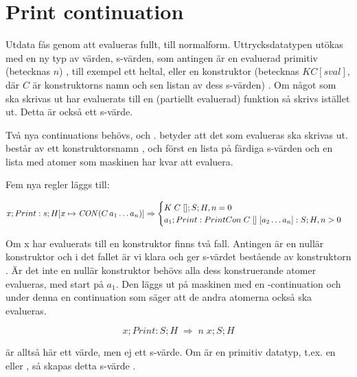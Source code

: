 \documentclass[../Appendix]{subfiles}
\begin{document}
\chapter{Print continuation}
\label{sec:printcont}
Utdata fås genom att  evalueras fullt, till normalform. 
Uttrycksdatatypen utökas med en ny typ av värden, 
s-värden, som antingen är en evaluerad primitiv (betecknas $n$)
, till exempel ett heltal, eller en konstruktor (betecknas $K C [sval]$, där
$C$ är konstruktorns namn och sen listan av dess s-värden) .
Om något som ska skrivas ut har evaluerats till en (partiellt evaluerad)
funktion så skrivs  istället ut. Detta är också ett s-värde.





Två nya continuations behövs,  och .
 betyder att det som evalueras ska skrivas ut.  består av ett
konstruktorsnamn , och först en lista på färdiga s-värden och en lista med
atomer som maskinen har kvar att evaluera.

Fem nya regler läggs till:

\[
x ; Print : s ; H[x \mapsto \text{\emph{CON}}(C\,a_1 \ldots a_n)]
\Rightarrow \begin{cases} 
K \; C \; [] ; S ; H , n = 0 \\
a_1 ; Print : PrintCon \; C \; [] \; [a_2 \ldots a_n] : S ; H , n > 0
\end{cases}
\]

Om x har evaluerats till en konstruktor  finns två fall. Antingen är 
en nullär konstruktor och i det fallet är vi klara och ger s-värdet bestående
av konstruktorn .
    Är det inte en nullär konstruktor behövs alla dess konstruerande atomer
evalueras, med start på $a_1$. Den läggs ut på maskinen med en -continuation
och under denna en continuation som säger att de andra atomerna också ska
evalueras.
 

\[
x ; Print : S ; H \; \Rightarrow \; n \; x ; S ; H
\]

 är alltså här ett värde, men ej ett s-värde.
Om  är en primitiv datatyp, t.ex. en  eller , så skapas detta s-värde
.
\end{document}
